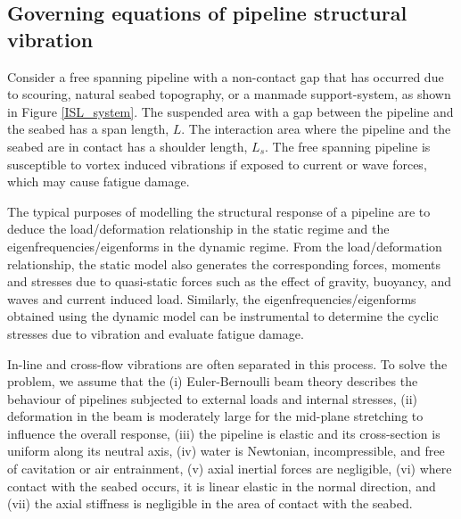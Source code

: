 \documentclass[3p,doublespacing,authoryear,11pt]{elsarticle} %
\begin{document}
\subsection{Governing equations of pipeline structural vibration}

Consider a free spanning pipeline with a non-contact gap that has occurred due to scouring, natural seabed topography, or a manmade support-system, as shown in Figure \ref{ISL_system}. The suspended area with a gap between the pipeline and the seabed has a span length, $L$.  The interaction area where the pipeline and the seabed are in contact has a shoulder length, $L_s$. The free spanning pipeline is susceptible to vortex induced vibrations if exposed to current or wave forces, which may cause fatigue damage. 

The typical purposes of modelling the structural response of a pipeline are to deduce the load/deformation relationship in the static regime and the eigenfrequencies/eigenforms in the dynamic regime. From the load/deformation relationship, the static model also generates the corresponding forces, moments and stresses due to quasi-static forces such as the effect of gravity, buoyancy, and waves and current induced load. Similarly, the eigenfrequencies/eigenforms obtained using the dynamic model can be instrumental to determine the cyclic stresses due to vibration and evaluate fatigue damage. 

In-line and cross-flow vibrations are often separated in this process. To solve the problem, we assume that the (i) Euler-Bernoulli beam theory describes the behaviour of pipelines subjected to external loads and internal stresses, (ii) deformation in the beam is moderately large for the mid-plane stretching to influence the overall response, (iii) the pipeline is elastic and its cross-section is uniform along its neutral axis, (iv) water is Newtonian, incompressible, and free of cavitation or air entrainment, (v) axial inertial forces are negligible, (vi) where contact with the seabed occurs, it is linear elastic in the normal direction, and (vii) the axial stiffness is negligible in the area of contact with the seabed. \\  
\end{document}
